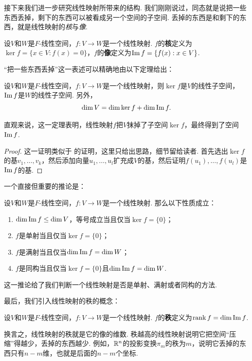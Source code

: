 接下来我们进一步研究线性映射所带来的结构. 我们刚刚说过，同态就是说把一些东西丢掉，剩下的东西可以被看成另一个空间的子空间. 丢掉的东西是和剩下的东西，就是线性映射的\textit{核}与\textit{像}. 

\begin{definition}[核与像]\label{def:kernel-image}
设$V$和$W$是$F$-线性空间，$f:V\to W$是一个线性映射. $f$的\textbf{核}定义为$\ker f=\{x\in V:f(x)=0\}$，$f$的\textbf{像}定义为$\operatorname*{Im} f=\{f(x):x\in V\}$. 
\end{definition}

“把一些东西丢掉”这一表述可以精确地由以下定理给出：

\begin{theorem}\label{thm:kernel-image-property}
设$V$和$W$是$F$-线性空间，$f:V\to W$是一个线性映射，则$\ker f$是$V$的线性子空间，$\operatorname*{Im} f$是$W$的线性子空间. 另外，
\[\dim V=\dim\ker f+\dim\operatorname*{Im} f.\]
\end{theorem}
直观来说，这一定理表明，线性映射$f$把$V$抹掉了子空间$\ker f$，最终得到了空间$\operatorname*{Im} f$. 
\begin{proof}
这一证明类似于 的证明，这里只给出思路，细节留给读者. 首先选出$\ker f$的基$v_1,\dots,v_k$，然后添加向量$u_1,\dots,u_l$扩充成$V$的基，然后证明$f(u_1),\dots,f(u_l)$是$\operatorname*{Im} f$的基. 
\end{proof}

一个直接但重要的推论是：
\begin{corollary}\label{cor:kernel-image-isomorphism}
设$V$和$W$是$F$-线性空间，$f:V\to W$是一个线性映射. 那么以下性质成立：
\begin{enumerate}
    \item $\dim \operatorname*{Im} f\leq \dim V$，等号成立当且仅当$\ker f=\{0\}$；
    \item $f$是单射当且仅当$\ker f=\{0\}$；
    \item $f$是满射当且仅当$\dim \operatorname*{Im} f=\dim W$；
    \item $f$是同构当且仅当$\ker f=\{0\}$且$\dim \operatorname*{Im} f=\dim W$. 
\end{enumerate}
\end{corollary}
这一推论给了我们判断一个线性映射是否是单射、满射或者同构的方法. 

最后，我们引入线性映射的秩的概念：
\begin{definition}[线性映射的秩]
设$V$和$W$是$F$-线性空间，$f:V\to W$是一个线性映射. $f$的\textbf{秩}定义为$\operatorname*{rank} f=\dim\operatorname*{Im} f$. 
\end{definition}

换言之，线性映射的秩就是它的像的维数. 秩越高的线性映射说明它把空间“压缩”得越少，丢掉的东西越少. 例如，$\mathbb{R}^n$的投影变换$\pi_m$的秩为$m$，说明它丢掉的东西只有$n-m$维，也就是后面的$n-m$个坐标. 

